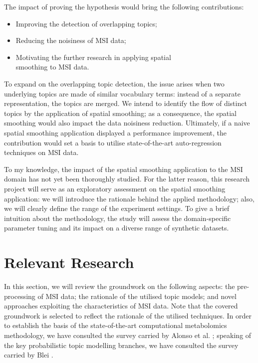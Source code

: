 \documentclass{mpaper}
\begin{document}
\par The impact of proving the hypothesis would bring the following contributions:
\begin{itemize}
	\item Improving the detection of overlapping topics;
	\item Reducing the noisiness of MSI data;
	\item Motivating the further research in applying spatial \\smoothing to MSI data.
\end{itemize} 
To expand on the overlapping topic detection, the issue arises when two underlying topics are made of similar vocabulary terms: instead of a separate representation, the topics are merged. We intend to identify the flow of distinct topics by the application of spatial smoothing; as a consequence, the spatial smoothing would also impact the data noisiness reduction. Ultimately, if a naive spatial smoothing application displayed a performance improvement, the contribution would set a basis to utilise state-of-the-art auto-regression techniques on MSI data.

\par To my knowledge, the impact of the spatial smoothing application to the MSI domain has not yet been thoroughly studied. For the latter reason, this research project will serve as an exploratory assessment on the spatial smoothing application: we will introduce the rationale behind the applied methodology; also, we will clearly define the range of the experiment settings. To give a brief intuition about the methodology, the study will assess the domain-specific parameter tuning and its impact on a diverse range of synthetic datasets.

\section{Relevant Research}

\par In this section, we will review the groundwork on the following aspects: the pre-processing of MSI data; the rationale of the utilised topic models; and novel approaches exploiting the characteristics of MSI data. Note that the covered groundwork is selected to reflect the rationale of the utilised techniques. In order to establish the basis of the state-of-the-art computational metabolomics methodology, we have consulted the survey carried by Alonso et al. \cite{alonso2015analytical}; speaking of the key probabilistic topic modelling branches, we have consulted the survey carried by Blei \cite{blei2012probabilistic}. 
\end{document}

